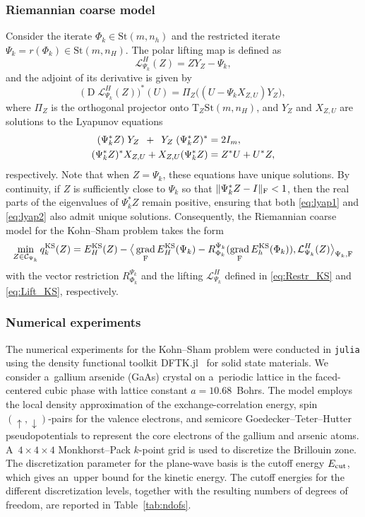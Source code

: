 \documentclass[11pt,reqno]{amsart}
\theoremstyle{plain}
\DeclareMathOperator{\Drm}{D}
\DeclareMathOperator{\grad}{grad}
\def\restr{r}
\newcommand\calC{\mathcal C}
\newcommand{\Tan}{\mathrm{T}}
\newcommand{\invRet}{\mathcal L}
\newcommand{\St}{\mathrm{St}}
\begin{document}
	\subsubsection{Riemannian coarse model} Consider the iterate $\Phi_k\in\St(m,n_h)$ and the restricted iterate $\Psi_k = \restr(\Phi_k)\in\St(m,n_H)$.
	The polar lifting map is defined as 
	\begin{equation}\label{eq:Lift_KS}
		\invRet_{\Psi_k}^H (Z) = Z Y_Z - \Psi_k,
	\end{equation}
	and the adjoint of its derivative is given by 
	\[
	\big(\Drm \invRet_{\Psi_k}^H(Z)\big)^{\ast}(U)
	= \Pi_Z\big((U-\Psi_k X_{Z,U})Y_Z\big),
	\]
	where $\Pi_Z$ is the orthogonal projector onto $\Tan_Z\St(m,n_H)$, and $Y_Z$ and $X_{Z,U}$ are solutions to the Lyapunov equations
	\begin{align}
		(\Psi_k^{\ast}Z)\; Y_Z \enskip + \enskip Y_Z \;(\Psi_k^{\ast}Z)^{\ast} & = 2I_m, \label{eq:lyap1}\\
		(\Psi_k^{\ast} Z)^{\ast} X_{Z,U} + X_{Z,U} (\Psi_k^{\ast}Z) & = Z^{\ast}U+U^{\ast}Z, \label{eq:lyap2}
	\end{align}
	respectively. Note that when $Z=\Psi_k$, these equations have unique solutions. By continuity, if $Z$ is sufficiently close to $\Psi_k$ so that $\|\Psi_k^*Z-I\|_{\rm F}<1$, then the real parts of the eigenvalues of $\Psi_k^*Z$ remain positive, ensuring that both \eqref{eq:lyap1} and \eqref{eq:lyap2} also admit unique solutions. Consequently, the Riemannian coarse model for the Kohn--Sham problem takes the form 
	\[
	\min_{Z\in \calC_{\Psi_k}} q_k^{\rm KS}(Z) = E^{\rm KS}
	_H(Z) - \big\langle \grad_{\rm F} E^{\rm KS}_H(\Psi_k) - R_{\Phi_k}^{\Psi_k} (\grad_{\rm F} E^{\rm KS}_h(\Phi_k)) , \invRet^H_{\Psi_k}(Z) \big\rangle_{\Psi_k, \rm F}
	\]
	with the vector restriction $R_{\Phi_k}^{\Psi_k}$ and  the lifting $\invRet^H_{\Psi_k}$ defined in \eqref{eq:Restr_KS} and \eqref{eq:Lift_KS}, respectively. 
	
	\subsubsection{Numerical experiments}
	
	The numerical experiments for the Kohn--Sham problem were conducted in \texttt{julia} using the density functional toolkit DFTK.jl~\cite{DFTKjcon} for solid state materials. 
	We consider a~gallium arsenide (GaAs) crystal on a~periodic lattice in the faced-centered cubic phase with lattice constant \mbox{$a = 10.68$}~Bohrs. The model employs the local density approximation of the exchange-correlation energy, spin $(\uparrow,\downarrow)$-pairs for the valence electrons, and semicore Goedecker--Teter--Hutter pseudopotentials to represent the core electrons of the gallium and arsenic atoms. 
	A~$4\times4\times4$ Monkhorst--Pack $k$-point grid is used to discretize the Brillouin zone. The discretization parameter for the plane-wave basis is the cutoff energy $E_{\rm cut}$, which gives an~upper bound for the kinetic energy. The cutoff energies for the different discretization levels, together with the resulting numbers of degrees of freedom, are reported in Table~\ref{tab:ndofs}.
	
\end{document}
